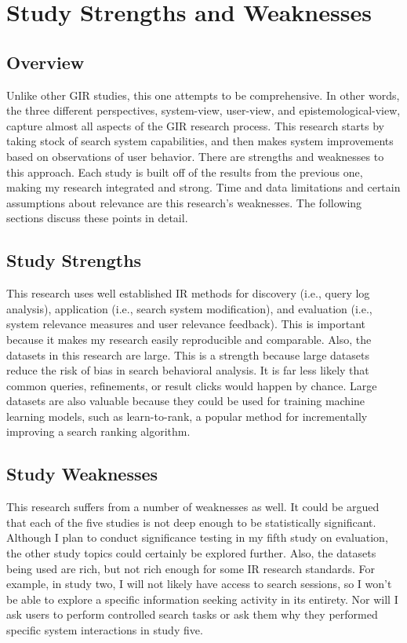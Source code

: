 \chapter{Study Strengths and Weaknesses} \label{ch:[chapter 6 label]}

\section{Overview}

Unlike other GIR studies, this one attempts to be comprehensive. In other words, the three different perspectives, system-view, user-view, and epistemological-view, capture almost all aspects of the GIR research process. This research starts by taking stock of search system capabilities, and then makes system improvements based on observations of user behavior. There are strengths and weaknesses to this approach. Each study is built off of the results from the previous one, making my research integrated and strong. Time and data limitations and certain assumptions about relevance are this research’s weaknesses. The following sections discuss these points in detail.

\section{Study Strengths}

This research uses well established IR methods for discovery (i.e., query log analysis), application (i.e., search system modification), and evaluation (i.e., system relevance measures and user relevance feedback). This is important because it makes my research easily reproducible and comparable. Also, the datasets in this research are large. This is a strength because large datasets reduce the risk of bias in search behavioral analysis. It is far less likely that common queries, refinements, or result clicks would happen by chance. Large datasets are also valuable because they could be used for training machine learning models, such as learn-to-rank, a popular method for incrementally improving a search ranking algorithm.

\section{Study Weaknesses}

This research suffers from a number of weaknesses as well. It could be argued that each of the five studies is not deep enough to be statistically significant. Although I plan to conduct significance testing in my fifth study on evaluation, the other study topics could certainly be explored further. Also, the datasets being used are rich, but not rich enough for some IR research standards. For example, in study two, I will not likely have access to search sessions, so I won’t be able to explore a specific information seeking activity in its entirety. Nor will I ask users to perform controlled search tasks or ask them why they performed specific system interactions in study five.

